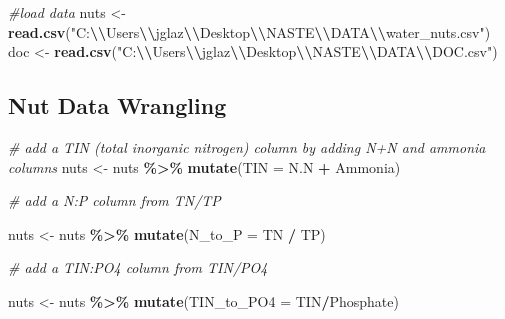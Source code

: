 \documentclass[
]{article}
\newenvironment{Shaded}{\begin{snugshade}}{\end{snugshade}}
\newcommand{\AttributeTok}[1]{\textcolor[rgb]{0.13,0.29,0.53}{#1}}
\newcommand{\CommentTok}[1]{\textcolor[rgb]{0.56,0.35,0.01}{\textit{#1}}}
\newcommand{\FunctionTok}[1]{\textcolor[rgb]{0.13,0.29,0.53}{\textbf{#1}}}
\newcommand{\NormalTok}[1]{#1}
\newcommand{\OtherTok}[1]{\textcolor[rgb]{0.56,0.35,0.01}{#1}}
\newcommand{\SpecialCharTok}[1]{\textcolor[rgb]{0.81,0.36,0.00}{\textbf{#1}}}
\newcommand{\StringTok}[1]{\textcolor[rgb]{0.31,0.60,0.02}{#1}}
\begin{document}
\begin{Shaded}
\begin{Highlighting}[]
\CommentTok{\#load data}
\NormalTok{nuts }\OtherTok{\textless{}{-}} \FunctionTok{read.csv}\NormalTok{(}\StringTok{"C:}\SpecialCharTok{\textbackslash{}\textbackslash{}}\StringTok{Users}\SpecialCharTok{\textbackslash{}\textbackslash{}}\StringTok{jglaz}\SpecialCharTok{\textbackslash{}\textbackslash{}}\StringTok{Desktop}\SpecialCharTok{\textbackslash{}\textbackslash{}}\StringTok{NASTE}\SpecialCharTok{\textbackslash{}\textbackslash{}}\StringTok{DATA}\SpecialCharTok{\textbackslash{}\textbackslash{}}\StringTok{water\_nuts.csv"}\NormalTok{)}
\NormalTok{doc }\OtherTok{\textless{}{-}} \FunctionTok{read.csv}\NormalTok{(}\StringTok{"C:}\SpecialCharTok{\textbackslash{}\textbackslash{}}\StringTok{Users}\SpecialCharTok{\textbackslash{}\textbackslash{}}\StringTok{jglaz}\SpecialCharTok{\textbackslash{}\textbackslash{}}\StringTok{Desktop}\SpecialCharTok{\textbackslash{}\textbackslash{}}\StringTok{NASTE}\SpecialCharTok{\textbackslash{}\textbackslash{}}\StringTok{DATA}\SpecialCharTok{\textbackslash{}\textbackslash{}}\StringTok{DOC.csv"}\NormalTok{)}
\end{Highlighting}
\end{Shaded}

\hypertarget{nut-data-wrangling}{%
\subsection{Nut Data Wrangling}\label{nut-data-wrangling}}

\begin{Shaded}
\begin{Highlighting}[]
\CommentTok{\# add a TIN (total inorganic nitrogen) column by adding N+N and ammonia columns}
\NormalTok{nuts }\OtherTok{\textless{}{-}}\NormalTok{ nuts }\SpecialCharTok{\%\textgreater{}\%}
  \FunctionTok{mutate}\NormalTok{(}\AttributeTok{TIN =}\NormalTok{ N.N }\SpecialCharTok{+}\NormalTok{ Ammonia)}

\CommentTok{\# add a N:P column from TN/TP}

\NormalTok{nuts }\OtherTok{\textless{}{-}}\NormalTok{ nuts }\SpecialCharTok{\%\textgreater{}\%}
  \FunctionTok{mutate}\NormalTok{(}\AttributeTok{N\_to\_P =}\NormalTok{ TN }\SpecialCharTok{/}\NormalTok{ TP)}

\CommentTok{\# add a TIN:PO4 column from TIN/PO4}

\NormalTok{nuts }\OtherTok{\textless{}{-}}\NormalTok{ nuts }\SpecialCharTok{\%\textgreater{}\%}
  \FunctionTok{mutate}\NormalTok{(}\AttributeTok{TIN\_to\_PO4 =}\NormalTok{ TIN}\SpecialCharTok{/}\NormalTok{Phosphate)}
\end{Highlighting}
\end{Shaded}
\end{document}
